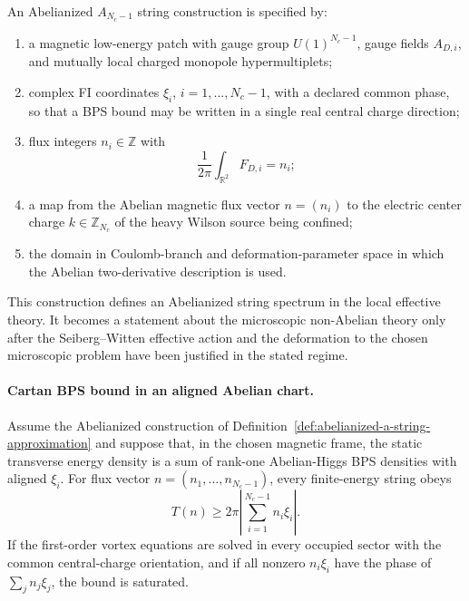 \begin{definition}
\label{def:abelianized-a-string-approximation}
An Abelianized \(A_{N_c-1}\) string construction is specified by:
\begin{enumerate}[label=(\roman*)]
\item a magnetic low-energy patch with gauge group \(U(1)^{N_c-1}\), gauge
  fields \(A_{D,i}\), and mutually local charged monopole hypermultiplets;
\item complex FI coordinates \(\xi_i\), \(i=1,\ldots,N_c-1\), with a declared
  common phase, so that a BPS bound may be written in a single real central
  charge direction;
\item flux integers \(n_i\in\mathbb Z\) with
  \[
    \frac{1}{2\pi}\int_{\mathbb R^2}F_{D,i}=n_i;
  \]
\item a map from the Abelian magnetic flux vector \(n=(n_i)\) to the
  electric center charge \(k\in\mathbb Z_{N_c}\) of the heavy Wilson source
  being confined;
\item the domain in Coulomb-branch and deformation-parameter space in which
  the Abelian two-derivative description is used.
\end{enumerate}
This construction defines an Abelianized string spectrum in the local effective
theory.  It becomes a statement about the microscopic non-Abelian theory only
after the Seiberg--Witten effective action and the deformation to the chosen
microscopic problem have been justified in the stated regime.
\end{definition}

\paragraph{Cartan BPS bound in an aligned Abelian chart.}
Assume the Abelianized construction of
Definition~\ref{def:abelianized-a-string-approximation} and suppose that, in the
chosen magnetic frame, the static transverse energy density is a sum of
rank-one Abelian-Higgs BPS densities with aligned \(\xi_i\).  For flux vector
\(n=(n_1,\ldots,n_{N_c-1})\), every finite-energy string obeys
\begin{equation}
  T(n)\ge
  2\pi\left|\sum_{i=1}^{N_c-1}n_i\xi_i\right|.
  \label{eq:cartan-abelian-string-bps-bound}
\end{equation}
If the first-order vortex equations are solved in every occupied sector with
the common central-charge orientation, and if all nonzero \(n_i\xi_i\) have
the phase of \(\sum_j n_j\xi_j\), the bound is saturated.

